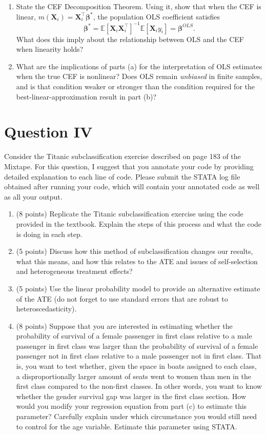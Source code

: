 \documentclass[letterpaper,12pt]{article}
\begin{document}
\begin{enumerate}[label=(\alph*)]

\item State the CEF Decomposition Theorem. Using it, show that when the CEF is linear, $m(\mathbf{X}_i)=\mathbf{X}_i^\top\boldsymbol{\beta}^*$, the population OLS coefficient satisfies
\[
\boldsymbol{\beta}^* = \mathbb{E}[\mathbf{X}_i\mathbf{X}_i^\top]^{-1}\mathbb{E}[\mathbf{X}_i y_i] = \boldsymbol{\beta}^{OLS}.
\]
What does this imply about the relationship between OLS and the CEF when linearity holds?

\item What are the implications of parts (a) for the interpretation of OLS estimates when the true CEF is nonlinear? Does OLS remain \textit{unbiased} in finite samples, and is that condition weaker or stronger than the condition required for the best-linear-approximation result in part (b)?

\end{enumerate}


\section*{Question IV}
Consider the Titanic subclassification exercise described on page 183 of the Mixtape. For this question, I suggest that you annotate your code by providing detailed explanation to each line of code. Please submit the STATA log file obtained after running your code, which will contain your annotated code as well as all your output.
\begin{enumerate}[label=(\alph*)] 
\item (8 points) Replicate the Titanic subclassification exercise using the code provided in the textbook. Explain the steps of this process and what the code is doing in each step.
\item (5 points)  Discuss how this method of subclassification changes our results, what this means, and how this relates to the ATE and issues of self-selection and heterogeneous treatment effects?
\item (5 points) Use the linear probability model to provide an alternative estimate of the ATE (do not forget to use standard errors that are robust to heteroscedasticity).
\item (8 points) Suppose that you are interested in estimating whether the probability of survival of a female passenger in first class relative to a male passenger in first class was larger than the probability of survival of a female passenger not in first class relative to a male passenger not in first class. That is, you want to test whether, given the space in boats assigned to each class, a disproportionally larger amount of seats went to women than men in the first class compared to the non-first classes. In other words, you want to know whether the gender survival gap was larger in the first class section. How would you modify your regression equation from part (c) to estimate this parameter? Carefully explain under which circumstance you would still need to control for the age variable. Estimate this parameter using STATA.     

\end{enumerate}
\end{document}
